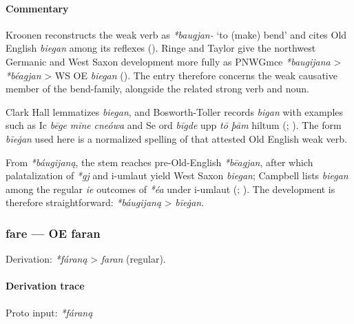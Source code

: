 \documentclass[
  british,
  a4paper,
]{article}
\begin{document}
\paragraph{Commentary}\label{commentary-4}

Kroonen reconstructs the weak verb as \emph{*baugjan-} `to (make) bend'
and cites Old English \emph{biegan} among its reflexes
(). Ringe and Taylor give the
northwest Germanic and West Saxon development more fully as PNWGmce
\emph{*baugijana} \textgreater{} \emph{*béagjan} \textgreater{} WS OE
\emph{biegan} ().
The entry therefore concerns the weak causative member of the
bend-family, alongside the related strong verb and noun.

Clark Hall lemmatizes \emph{biegan}, and Bosworth-Toller records
\emph{bigan} with examples such as Ic \emph{bēge} \emph{mīne}
\emph{cneówa} and Se ord \emph{bīgde} upp \emph{tō} \emph{þām} hiltum
(;
). The
form \emph{bīeġan} used here is a normalized spelling of that attested
Old English weak verb.

From \emph{*báugijaną}, the stem reaches pre-Old-English
\emph{*bēagjan}, after which palatalization of \emph{*gj} and i-umlaut
yield West Saxon \emph{biegan}; Campbell lists \emph{biegan} among the
regular \emph{ie} outcomes of \emph{*éa} under i-umlaut
(;
). The development is
therefore straightforward: \emph{*báugijaną} \textgreater{}
\emph{bīeġan}.

\subsubsection{fare --- OE faran}\label{fare-oe-faran-1}

Derivation: \emph{*fáraną} \textgreater{} \emph{faran} (regular).

\paragraph{Derivation trace}\label{derivation-trace-17}

Proto input: \emph{*fáraną}

\begingroup
\setlength{\fboxsep}{6pt}
\end{document}
